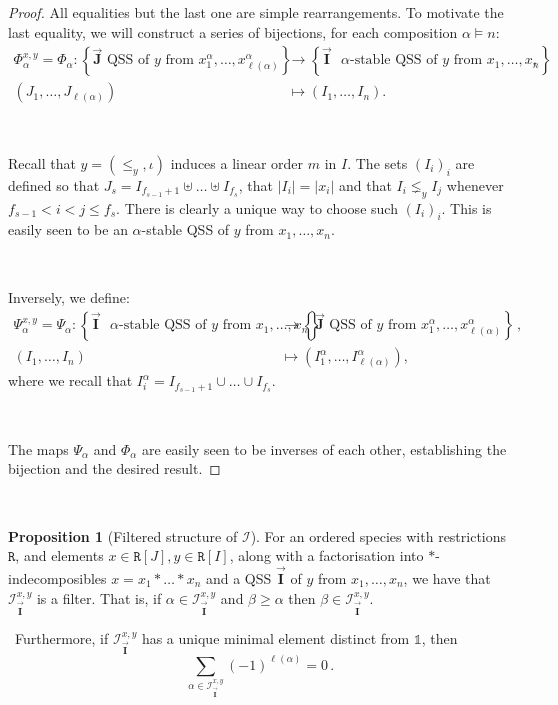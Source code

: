 \documentclass[12pt, reqno]{amsart}
\theoremstyle{definition}
\newtheorem{prop}[thm]{Proposition}
\newtheorem{smpl}[thm]{Example}
\newcommand{\III}{\vec{\mathbf{I}}}
\newcommand{\JJJ}{\vec{\mathbf{J}}}
\DeclareMathOperator{\pat}{\mathbf{pat}}
\begin{document}
\begin{proof}
All equalities but the last one are simple rearrangements.
To motivate the last equality, we will construct a series of bijections, for each composition $\alpha \models n$:
\begin{align*}
    \Phi_{\alpha}^{x, y} = \Phi_{\alpha} : \left\{ \JJJ \text{ QSS of $y$ from $x^{\alpha}_1, \dots, x^{\alpha}_{\ell(\alpha)}$}\right\} &\to \left\{ \III \text{ $\alpha$-stable QSS of $y$ from $x_1, \dots, x_n$}\right\}\, , \\
    (J_1, \dots, J_{\ell(\alpha)} ) &\mapsto (I_1, \dots , I_n).
\end{align*}

\

Recall that $y = (\leq_y, \iota)$ induces a linear order $m$ in $I$.
The sets $(I_i)_i$ are defined so that $J_s = I_{f_{s-1}+1} \uplus \dots \uplus I_{f_s}$, that $|I_i | = |x_i|$ and that $I_i \lneq_y I_j $ whenever $f_{s-1} < i < j \leq f_{s}$.
There is clearly a unique way to choose such $(I_i)_i$.
This is easily seen to be an $\alpha$-stable QSS of $y$ from $x_1, \dots, x_n$.

\

Inversely, we define:
\begin{align*}
    \Psi_{\alpha}^{x, y} = \Psi_{\alpha}  : \left\{ \III \text{ $\alpha$-stable QSS of $y$ from $x_1, \dots, x_n$}\right\} &\to \left\{ \JJJ \text{ QSS of $y$ from $x^{\alpha}_1, \dots, x^{\alpha}_{\ell(\alpha)}$}\right\} \, , \\
    (I_1, \dots , I_n) &\mapsto (I_1^{\alpha}, \dots, I^{\alpha}_{\ell(\alpha)} ),
\end{align*}
where we recall that $I^{\alpha}_i = I_{f_{s-1}+1} \cup \dots  \cup I_{f_s}$.

\

The maps $\Psi_{\alpha}$ and $\Phi_{\alpha}$ are easily seen to be inverses of each other, establishing the bijection and the desired result.
\end{proof}

\

%

\begin{prop}[Filtered structure of $\mathcal I$]\label{prop:filter_structure_I}
For an ordered species with restrictions $\mathtt{R}$, and elements $x\in  \mathtt{R}[J], y\in \mathtt{R}[I]$, along with a factorisation into $\ast$-indecomposibles $x = x_1 \ast \dots \ast x_n$ and a QSS $\III$ of $y$ from $x_1, \dots, x_n$, we have that $\mathcal I^{ x, y}_{\III}$ is a filter.
That is, if $\alpha \in \mathcal I^{ x, y}_{\III}$ and $\beta \geq \alpha$ then $\beta \in \mathcal I^{ x, y}_{\III}$.

\
Furthermore, if $\mathcal I^{ x, y}_{\III}$ has a unique minimal element distinct from $\mathbb{1}$, then
$$\sum_{\alpha \in \mathcal I^{x, y}_{\III}} (-1)^{\ell(\alpha)} = 0 \, .$$
\end{prop}
\end{document}
